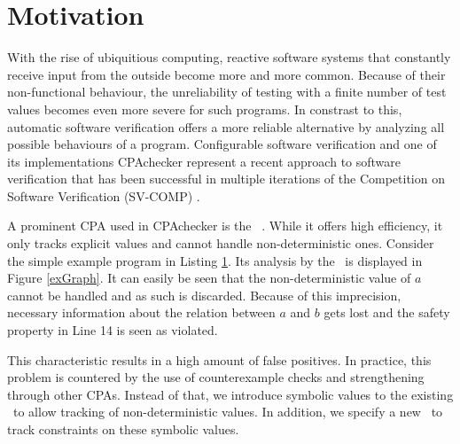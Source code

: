 \section{Motivation}
With the rise of ubiquitious computing, reactive software systems that constantly receive input from the outside become more and more common.
Because of their non\--func\-tio\-nal behaviour, the unreliability of testing with a finite number of test values becomes even more severe for such programs.
In constrast to this, automatic software verification offers a more reliable alternative by analyzing all possible behaviours of a program.
Configurable software verification\cite{Beyer2007} and one of its implementations CPAchecker\cite{Beyer2011} represent a recent approach to software verification that has been successful in
multiple iterations of the Competition on Software Verification (SV-COMP) \cite{SV-COMP2013} \cite{SV-COMP2014} \cite{SV-COMP2015}.

A prominent CPA used in CPAchecker is the \ \cite{Beyer2013}.
While it offers high efficiency, it only tracks explicit values and cannot handle non-deterministic ones.
Consider the simple example program in Listing \ref{exProg}. Its analysis by the \ is displayed in Figure \ref{exGraph}.
It can easily be seen that the non-deterministic value of $a$ cannot be handled and as such is discarded.
Because of this imprecision, necessary information about the relation between $a$ and $b$ gets lost and the safety property in Line 14 is seen as violated.

\begin{figure}[h]
\label{exProg}
\lstset{numbers=left}

\end{figure}

This characteristic results in a high amount of false positives.
In practice, this problem is countered by the use of counterexample checks and strengthening through other CPAs.
Instead of that, we introduce symbolic values to the existing \ to allow tracking of non-deterministic values.
In addition, we specify a new \constraintsCPA\ to track constraints on these symbolic values.

